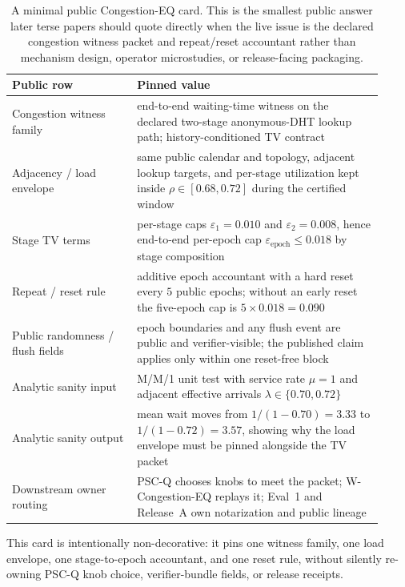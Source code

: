 \documentclass[11pt]{article}
\theoremstyle{definition}
\theoremstyle{remark}
\newcommand{\eps}{\varepsilon}
\begin{document}
\begin{table}[t]
\centering
\small
\begin{tabular}{@{}p{0.31\linewidth}p{0.61\linewidth}@{}}
\toprule
\textbf{Public row} & \textbf{Pinned value}\\
\midrule
Congestion witness family & end-to-end waiting-time witness on the declared two-stage anonymous-DHT lookup path; history-conditioned TV contract\\
Adjacency / load envelope & same public calendar and topology, adjacent lookup targets, and per-stage utilization kept inside $\rho\in[0.68,0.72]$ during the certified window\\
Stage TV terms & per-stage caps $\eps_1=0.010$ and $\eps_2=0.008$, hence end-to-end per-epoch cap $\eps_{\mathrm{epoch}}\le 0.018$ by stage composition\\
Repeat / reset rule & additive epoch accountant with a hard reset every $5$ public epochs; without an early reset the five-epoch cap is $5\times 0.018=0.090$\\
Public randomness / flush fields & epoch boundaries and any flush event are public and verifier-visible; the published claim applies only within one reset-free block\\
Analytic sanity input & M/M/1 unit test with service rate $\mu=1$ and adjacent effective arrivals $\lambda\in\{0.70,0.72\}$\\
Analytic sanity output & mean wait moves from $1/(1-0.70)=3.33$ to $1/(1-0.72)=3.57$, showing why the load envelope must be pinned alongside the TV packet\\
Downstream owner routing & PSC-Q chooses knobs to meet the packet; W-Congestion-EQ replays it; Eval~1 and Release~A own notarization and public lineage\\
\bottomrule
\end{tabular}
\caption{A minimal public Congestion-EQ card. This is the smallest public answer later terse papers should quote directly when the live issue is the declared congestion witness packet and repeat/reset accountant rather than mechanism design, operator microstudies, or release-facing packaging.}
\label{tab:minimal-congeq-card}
\end{table}

This card is intentionally non-decorative: it pins one witness family, one load envelope, one stage-to-epoch accountant, and one reset rule, without silently re-owning PSC-Q knob choice, verifier-bundle fields, or release receipts.
\end{document}
